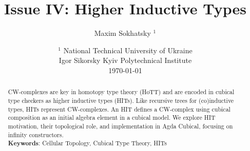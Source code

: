 \documentclass{article}
\theoremstyle{definition}
\begin{document}
\title{Issue IV: Higher Inductive Types}
\author{Maxim Sokhatsky $^1$}
\date{ $^1$ National Technical University of Ukraine \\
       \small Igor Sikorsky Kyiv Polytechnical Institute \\
       \today }
\maketitle

\begin{abstract}
CW-complexes are key in homotopy type theory (HoTT) and are encoded
in cubical type checkers as higher inductive types (HITs). Like
recursive trees for (co)inductive types, HITs represent CW-complexes.
An HIT defines a CW-complex using cubical composition as an initial
algebra element in a cubical model. We explore HIT motivation, their
topological role, and implementation in Agda Cubical, focusing on infinity constructors. \\
{\bf Keywords}: Cellular Topology, Cubical Type Theory, HITs
\end{abstract}

\tableofcontents
\newpage
\end{document}

